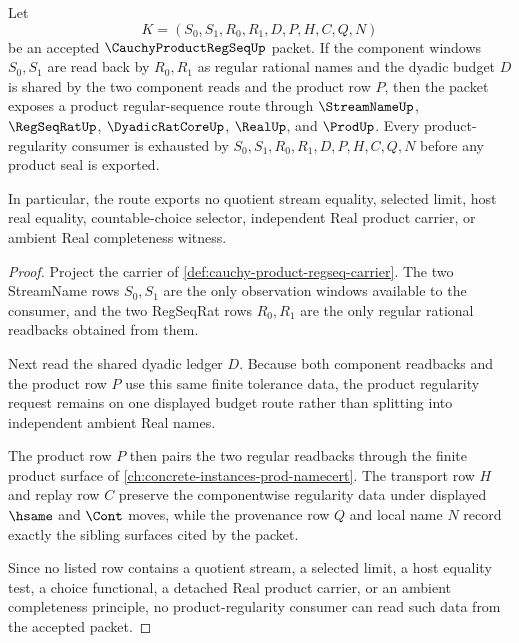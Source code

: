 \begin{theorem}
\label{thm:cauchy-product-regseq-regularity}
Let
$$
K=(S_0,S_1,R_0,R_1,D,P,H,C,Q,N)
$$
be an accepted $\CauchyProductRegSeqUp$ packet. If the component windows $S_0,S_1$ are read back by $R_0,R_1$ as regular rational names and the dyadic budget $D$ is shared by the two component reads and the product row $P$, then the packet exposes a product regular-sequence route through $\StreamNameUp$, $\RegSeqRatUp$, $\DyadicRatCoreUp$, $\RealUp$, and $\ProdUp$. Every product-regularity consumer is exhausted by $S_0,S_1,R_0,R_1,D,P,H,C,Q,N$ before any product seal is exported.

In particular, the route exports no quotient stream equality, selected limit, host real equality, countable-choice selector, independent Real product carrier, or ambient Real completeness witness.
\end{theorem}
\begin{proof}
Project the carrier of \autoref{def:cauchy-product-regseq-carrier}. The two StreamName rows $S_0,S_1$ are the only observation windows available to the consumer, and the two RegSeqRat rows $R_0,R_1$ are the only regular rational readbacks obtained from them.

Next read the shared dyadic ledger $D$. Because both component readbacks and the product row $P$ use this same finite tolerance data, the product regularity request remains on one displayed budget route rather than splitting into independent ambient Real names.

The product row $P$ then pairs the two regular readbacks through the finite product surface of \autoref{ch:concrete-instances-prod-namecert}. The transport row $H$ and replay row $C$ preserve the componentwise regularity data under displayed $\hsame$ and $\Cont$ moves, while the provenance row $Q$ and local name $N$ record exactly the sibling surfaces cited by the packet.

Since no listed row contains a quotient stream, a selected limit, a host equality test, a choice functional, a detached Real product carrier, or an ambient completeness principle, no product-regularity consumer can read such data from the accepted packet.
\end{proof}

